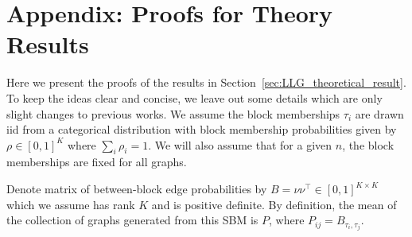 %
%






\section{Appendix: Proofs for Theory Results}
\label{sec:LLG_proof}

Here we present the proofs of the results in Section~\ref{sec:LLG_theoretical_result}. To keep the ideas clear and concise, we leave out some details which are only slight changes to previous works.
We assume the block memberships $\tau_i$ are drawn iid from a categorical distribution with block membership probabilities given by $\rho\in[0,1]^K$ where $\sum_i \rho_i =1$.
We will also assume that for a given $n$, the block memberships are fixed for all graphs.

Denote matrix of between-block edge probabilities by $B = \nu \nu^{\top} \in[0,1]^{K\times K}$ which we assume has rank $K$ and is positive definite. 
By definition, the mean of the collection of graphs generated from this SBM is $P$, where $P_{ij} = B_{\tau_i, \tau_j}$. 

